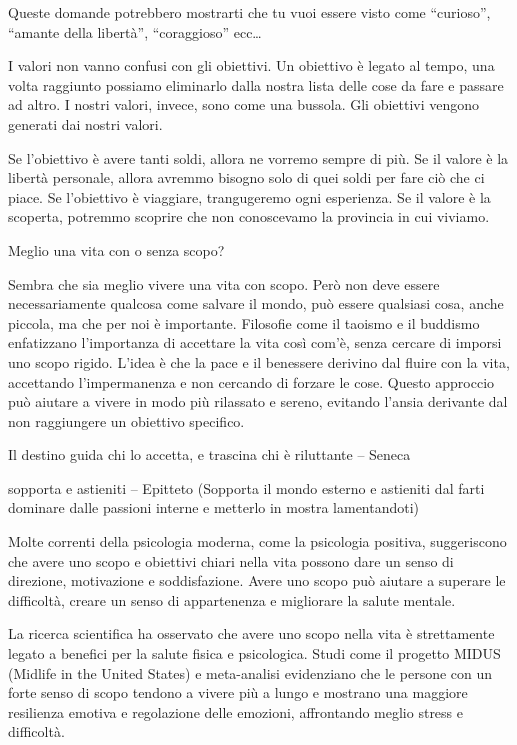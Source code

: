 \documentclass[12pt]{book} %
\begin{document}
Queste domande potrebbero mostrarti che tu vuoi essere visto come “curioso”, “amante della libertà”, “coraggioso” ecc… 

I valori non vanno confusi con gli obiettivi. Un obiettivo è legato al tempo, una volta raggiunto possiamo eliminarlo dalla nostra lista delle cose da fare e passare ad altro. I nostri valori, invece, sono come una bussola. Gli obiettivi vengono generati dai nostri valori.

Se l'obiettivo è avere tanti soldi, allora ne vorremo sempre di più. Se il valore è la libertà personale, allora avremmo bisogno solo di quei soldi per fare ciò che ci piace. Se l'obiettivo è viaggiare, trangugeremo ogni esperienza. Se il valore è la scoperta, potremmo scoprire che non conoscevamo la provincia in cui viviamo.

\begin{mdframed}[linewidth=1pt]
Meglio una vita con o senza scopo?

Sembra che sia meglio vivere una vita con scopo. Però non deve essere necessariamente qualcosa come salvare il mondo, può essere qualsiasi cosa, anche piccola, ma che per noi è importante. Filosofie come il taoismo e il buddismo enfatizzano l'importanza di accettare la vita così com'è, senza cercare di imporsi uno scopo rigido. L'idea è che la pace e il benessere derivino dal fluire con la vita, accettando l'impermanenza e non cercando di forzare le cose. Questo approccio può aiutare a vivere in modo più rilassato e sereno, evitando l'ansia derivante dal non raggiungere un obiettivo specifico.

Il destino guida chi lo accetta, e trascina chi è riluttante – Seneca

sopporta e astieniti – Epitteto (Sopporta il mondo esterno e astieniti dal farti dominare dalle passioni interne e metterlo in mostra lamentandoti)

Molte correnti della psicologia moderna, come la psicologia positiva, suggeriscono che avere uno scopo e obiettivi chiari nella vita possono dare un senso di direzione, motivazione e soddisfazione. Avere uno scopo può aiutare a superare le difficoltà, creare un senso di appartenenza e migliorare la salute mentale.

La ricerca scientifica ha osservato che avere uno scopo nella vita è strettamente legato a benefici per la salute fisica e psicologica. Studi come il progetto MIDUS (Midlife in the United States) e meta-analisi evidenziano che le persone con un forte senso di scopo tendono a vivere più a lungo e mostrano una maggiore resilienza emotiva e regolazione delle emozioni, affrontando meglio stress e difficoltà. 


\end{mdframed}
\end{document}
